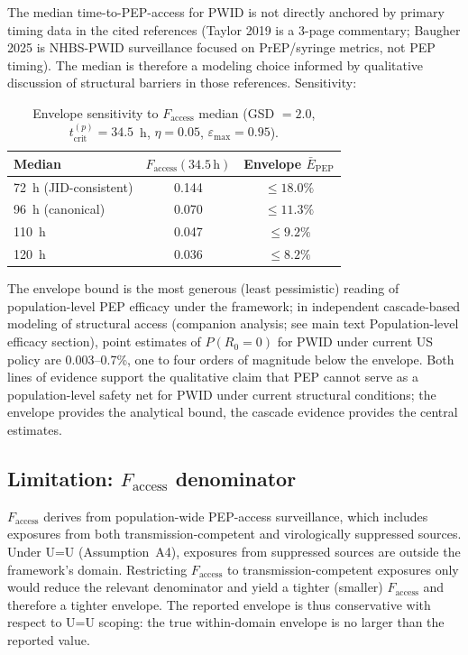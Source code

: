 \documentclass[11pt]{article}
\theoremstyle{definition}
\theoremstyle{remark}
\newcommand{\Ebarpep}{\bar{E}_{\text{PEP}}}
\newcommand{\Faccess}{F_{\text{access}}}
\newcommand{\tcrit}{t_{\text{crit}}}
\newcommand{\emax}{\varepsilon_{\max}}
\begin{document}
The median time-to-PEP-access for PWID is not directly anchored by primary timing data in the cited references (Taylor 2019\cite{taylor2019_si} is a 3-page commentary; Baugher 2025\cite{baugher2025_si} is NHBS-PWID surveillance focused on PrEP/syringe metrics, not PEP timing). The median is therefore a modeling choice informed by qualitative discussion of structural barriers in those references. Sensitivity:

\begin{table}[H]
\centering
\small
\caption{Envelope sensitivity to $\Faccess$ median (GSD $= 2.0$, $\tcrit^{(p)} = 34.5$~h, $\eta = 0.05$, $\emax = 0.95$).}
\begin{tabular}{@{}lcc@{}}
\toprule
\textbf{Median} & \textbf{$\Faccess(34.5\,\text{h})$} & \textbf{Envelope $\Ebarpep$} \\
\midrule
72~h (JID-consistent) & 0.144 & $\leq 18.0\%$ \\
96~h (canonical)      & 0.070 & $\leq 11.3\%$ \\
110~h                 & 0.047 & $\leq 9.2\%$  \\
120~h                 & 0.036 & $\leq 8.2\%$  \\
\bottomrule
\end{tabular}
\end{table}

The envelope bound is the most generous (least pessimistic) reading of population-level PEP efficacy under the framework; in independent cascade-based modeling of structural access (companion analysis; see main text Population-level efficacy section), point estimates of $P(R_{0}=0)$ for PWID under current US policy are 0.003--0.7\%, one to four orders of magnitude below the envelope. Both lines of evidence support the qualitative claim that PEP cannot serve as a population-level safety net for PWID under current structural conditions; the envelope provides the analytical bound, the cascade evidence provides the central estimates.

\subsection{Limitation: \texorpdfstring{$\Faccess$}{Faccess} denominator}

$\Faccess$ derives from population-wide PEP-access surveillance, which includes exposures from both transmission-competent and virologically suppressed sources. Under U=U (Assumption~A4), exposures from suppressed sources are outside the framework's domain. Restricting $\Faccess$ to transmission-competent exposures only would reduce the relevant denominator and yield a tighter (smaller) $\Faccess$ and therefore a tighter envelope. The reported envelope is thus conservative with respect to U=U scoping: the true within-domain envelope is no larger than the reported value.
\end{document}
